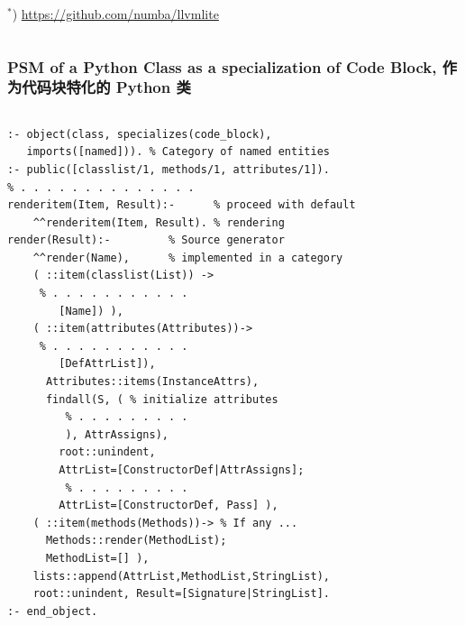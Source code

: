 \documentclass[10pt]{beamer}
\begin{document}
\begin{frame}[fragile]
\begin{columns}
\begin{column}{0.4\textwidth}
  ${}^*$) \url{https://github.com/numba/llvmlite}
    \end{column}
  \end{columns}
\end{frame}

\begin{frame}[fragile]
  \frametitle{PSM of a Python Class as a specialization of Code Block, 作为代码块特化的 Python 类}
  \begin{columns}
    \begin{column}{0.6\textwidth}
      \flushleft
\begin{verbatim}
:- object(class, specializes(code_block),
   imports([named])). % Category of named entities
:- public([classlist/1, methods/1, attributes/1]).
% . . . . . . . . . . . . . .
renderitem(Item, Result):-      % proceed with default
    ^^renderitem(Item, Result). % rendering
render(Result):-         % Source generator
    ^^render(Name),      % implemented in a category
    ( ::item(classlist(List)) ->
     % . . . . . . . . . . .
        [Name]) ),
    ( ::item(attributes(Attributes))->
     % . . . . . . . . . . .
        [DefAttrList]),
      Attributes::items(InstanceAttrs),
      findall(S, ( % initialize attributes
         % . . . . . . . . .
         ), AttrAssigns),
        root::unindent,
        AttrList=[ConstructorDef|AttrAssigns];
         % . . . . . . . . .
        AttrList=[ConstructorDef, Pass] ),
    ( ::item(methods(Methods))-> % If any ...
      Methods::render(MethodList);
      MethodList=[] ),
    lists::append(AttrList,MethodList,StringList),
    root::unindent, Result=[Signature|StringList].
:- end_object.
\end{verbatim}
    \end{column}
    \begin{column}{0.4\linewidth}

\end{column}
\end{columns}
\end{frame}
\end{document}
